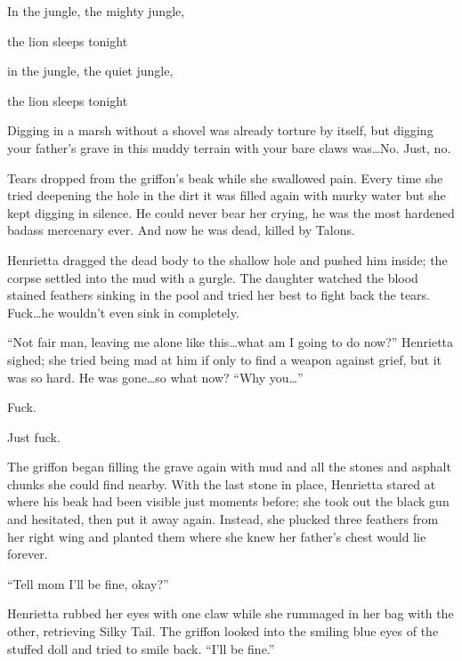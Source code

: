 \begin{song}
    In the jungle, the mighty jungle,

    the lion sleeps tonight

    in the jungle, the quiet jungle,

    the lion sleeps tonight
\end{song}

\horizonline


Digging in a marsh without a shovel was already torture by itself, but digging your father's grave in this muddy terrain with your bare claws was\dots No. Just, no.

Tears dropped from the griffon's beak while she swallowed pain. Every time she tried deepening the hole in the dirt it was filled again with murky water but she kept digging in silence. He could never bear her crying, he was the most hardened badass mercenary ever. And now he was dead, killed by Talons.

Henrietta dragged the dead body to the shallow hole and pushed him inside; the corpse settled into the mud with a gurgle. The daughter watched the blood stained feathers sinking in the pool and tried her best to fight back the tears. Fuck\dots he wouldn't even sink in completely.

``Not fair man, leaving me alone like this\dots what am I going to do now?'' Henrietta sighed; she tried being mad at him if only to find a weapon against grief, but it was so hard. He was gone\dots so what now? ``Why you\dots''

Fuck.

Just fuck.

The griffon began filling the grave again with mud and all the stones and asphalt chunks she could find nearby. With the last stone in place, Henrietta stared at where his beak had been visible just moments before; she took out the black gun and hesitated, then put it away again. Instead, she plucked three feathers from her right wing and planted them where she knew her father's chest would lie forever.

``Tell mom I'll be fine, okay?''

Henrietta rubbed her eyes with one claw while she rummaged in her bag with the other, retrieving Silky Tail. The griffon looked into the smiling blue eyes of the stuffed doll and tried to smile back. ``I'll be fine.''

\horizonline

